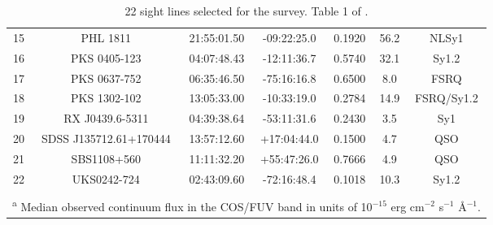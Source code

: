 \begin{table}
\begin{tabular}{ccccccc}
            15  &  PHL 1811  &  21:55:01.50  &  -09:22:25.0  &  0.1920  &  56.2  &  NLSy1  \\
            16  &  PKS 0405-123  &  04:07:48.43  &  -12:11:36.7  &  0.5740  &  32.1  &  Sy1.2  \\
            17  &  PKS 0637-752  &  06:35:46.50  &  -75:16:16.8  &  0.6500  &  8.0  &  FSRQ  \\
            18  &  PKS 1302-102  &  13:05:33.00  &  -10:33:19.0  &  0.2784  &  14.9  &  FSRQ/Sy1.2  \\
            19  &  RX J0439.6-5311  &  04:39:38.64  &  -53:11:31.6  &  0.2430  &  3.5  &  Sy1  \\
            20  &  SDSS J135712.61+170444  &  13:57:12.60  &  +17:04:44.0  &  0.1500  &  4.7  &  QSO  \\
            21  &  SBS1108+560  &  11:11:32.20  &  +55:47:26.0  &  0.7666  &  4.9  &  QSO  \\
            22  &  UKS0242-724  &  02:43:09.60  &  -72:16:48.4  &  0.1018  &  10.3  &  Sy1.2  \\

           \tabularnewline \hline \hline 
           \multicolumn{7}{l}{\textsuperscript{a} \footnotesize{Median observed continuum flux in the COS/FUV band in units of 10$^{-15}$ erg cm$^{-2}$ s$^{-1}$ \AA$^{-1}$. }}
    \end{tabular}
\caption{22 sight lines selected for the survey. Table 1 of \citet{danforth-2016}.}
\label{tab:LOS}
\end{table}

